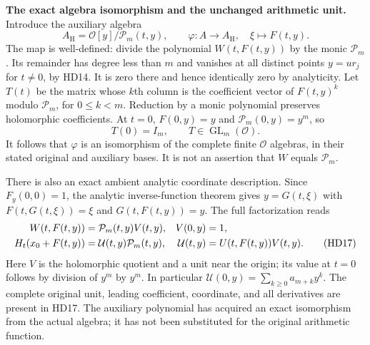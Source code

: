\HD\textbf{The exact algebra isomorphism and the unchanged arithmetic unit.}
Introduce the auxiliary algebra
\[
 A_{\mathrm H}=\mathcal O[y]/\mathcal P_m(t,y),\qquad
 \varphi:A\longrightarrow A_{\mathrm H},\quad \xi\longmapsto F(t,y).
 \tag{HD15}\label{hd:isomorphism}
\]
The map is well-defined: divide the polynomial $W(t,F(t,y))$ by
the monic $\mathcal P_m$. Its remainder has degree less than $m$
and vanishes at all distinct points $y=ur_j$ for $t\ne0$, by HD14.
It is zero there and hence identically zero by analyticity.
Let $T(t)$ be the matrix whose $k$th column is the coefficient
vector of $F(t,y)^k$ modulo $\mathcal P_m$, for $0\le k<m$.
Reduction by a monic polynomial preserves holomorphic coefficients.
At $t=0$, $F(0,y)=y$ and $\mathcal P_m(0,y)=y^m$, so
\[
 T(0)=I_m,\qquad T\in\operatorname{GL}_m(\mathcal O).
 \tag{HD16}\label{hd:T}
\]
It follows that $\varphi$ is an isomorphism of the complete finite
$\mathcal O$ algebras, in their stated original and auxiliary bases.
It is not an assertion that $W$ equals $\mathcal P_m$.

There is also an exact ambient analytic coordinate description.
Since $F_y(0,0)=1$, the analytic inverse-function theorem gives
$y=G(t,\xi)$ with $F(t,G(t,\xi))=\xi$ and $G(t,F(t,y))=y$.
The full factorization reads
\begin{align}
 W(t,F(t,y))&=\mathcal P_m(t,y)V(t,y),& V(0,y)&=1,\notag\\
 H_t(x_0+F(t,y))&=\mathcal U(t,y)\mathcal P_m(t,y),&
 \mathcal U(t,y)&=U(t,F(t,y))V(t,y).
 \tag{HD17}\label{hd:unit}
\end{align}
Here $V$ is the holomorphic quotient and a unit near the origin;
its value at $t=0$ follows by division of $y^m$ by $y^m$.
In particular $\mathcal U(0,y)=\sum_{k\ge0}a_{m+k}y^k$.
The complete original unit, leading coefficient, coordinate,
and all derivatives are present in HD17. The auxiliary polynomial
has acquired an exact isomorphism from the actual algebra; it has
not been substituted for the original arithmetic function.

